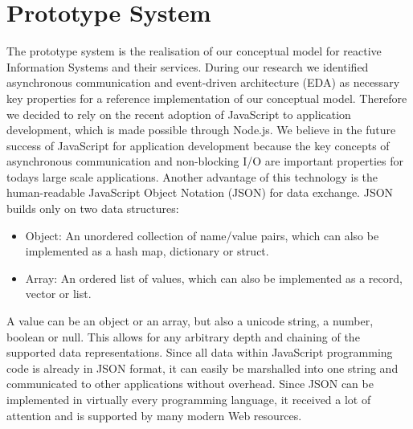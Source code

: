 

\chapter{Prototype System}
The prototype system is the realisation of our conceptual model for reactive Information Systems and their services.
During our research we identified asynchronous communication and event-driven architecture (\textrm{EDA}) as necessary key properties for a reference implementation of our conceptual model.
Therefore we decided to rely on the recent adoption of JavaScript to application development, which is made possible through \textrm{Node.js}.
We believe in the future success of \textrm{JavaScript} for application development because the key concepts of asynchronous communication and non-blocking I/O are important properties for todays large scale applications.
Another advantage of this technology is the human-readable \textrm{JavaScript Object Notation} (\textrm{JSON}) for data exchange.
\textrm{JSON} builds only on two data structures:
\begin{itemize}
	\item Object: An unordered collection of name/value pairs, which can also be implemented as a hash map, dictionary or struct.
	\item Array: An ordered list of values, which can also be implemented as a record, vector or list.
\end{itemize}
A value can be an object or an array, but also a unicode string, a number, boolean or null.
This allows for any arbitrary depth and chaining of the supported data representations.
Since all data within JavaScript programming code is already in JSON format, it can easily be marshalled into one string and communicated to other applications without overhead.
Since \textrm{JSON} can be implemented in virtually every programming language, it received a lot of attention and is supported by many modern Web resources.

